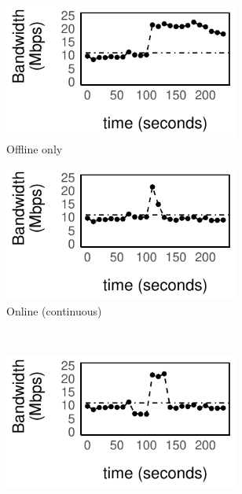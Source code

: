 \begin{figure}
  \centering
  \begin{subfigure}[t]{0.5\columnwidth}
    \centering
    \includegraphics[width=0.85\textwidth]{figures/online1.pdf}
    \caption{Offline only}
    \label{fig:offline}
  \end{subfigure}%
  \begin{subfigure}[t]{0.5\columnwidth}
    \centering
    \includegraphics[width=0.85\textwidth]{figures/online2.pdf}
    \caption{Online (continuous)}
    \label{fig:online}
  \end{subfigure}
  \\
  \vspace{0.5em}
  \begin{subfigure}[t]{0.5\columnwidth}
    \centering
    \includegraphics[width=0.85\textwidth]{figures/online3.pdf}

\end{subfigure}
\end{figure}
